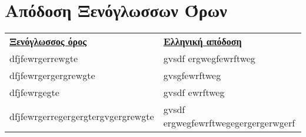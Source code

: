 \chapter{Απόδοση Ξενόγλωσσων Όρων}
\begin{center}
\begin{tabular}{ll}
    \large{\textbf{\underline{Ξενόγλωσσος όρος}}} & \large{\textbf{\underline{Ελληνική απόδοση}}}\\
    
    dfjfewrgerrewgte & gvsdf ergwegfewrftweg\\
    dfjfewrgergergrewgte & gvsgfewrftweg\\
    dfjfewrgegte & gvsdf ewrftweg\\
    dfjfewrgerregergergtergvgergrewgte & gvsdf ergwegfewrftwegegergergerwgerf
\end{tabular}
\end{center}

